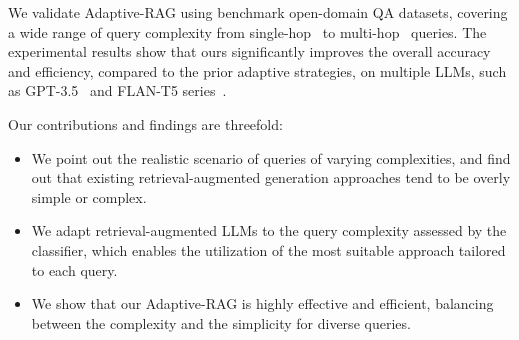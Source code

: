 We validate Adaptive-RAG using benchmark open-domain QA datasets, covering a wide range of query complexity from single-hop~\cite{squad, tqa, nq} to multi-hop~\cite{hotpotqa, 2hop, trivedi-etal-2022-musique} queries. The experimental results show that ours significantly improves the overall accuracy and efficiency, compared to the prior adaptive strategies, on multiple LLMs, such as GPT-3.5~\cite{GPT-3} and FLAN-T5 series~\cite{flan}.


Our contributions and findings are threefold:

\vspace{-0.075in}

\begin{itemize}[itemsep=0.3mm, parsep=1pt, leftmargin=*]
  \item We point out the realistic scenario of queries of varying complexities, and find out that existing retrieval-augmented generation approaches tend to be overly simple or complex.
  \item We adapt retrieval-augmented LLMs to the query complexity assessed by the classifier, which enables the utilization of the most suitable approach tailored to each query.
  \item We show that our Adaptive-RAG is highly effective and efficient, balancing between the complexity and the simplicity for diverse queries.
\end{itemize}
